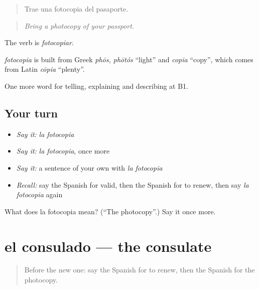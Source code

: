 \begin{quote}
Trae una fotocopia del pasaporte.
\end{quote}

\begin{quote}
\emph{Bring a photocopy of your passport.}
\end{quote}

The verb is \emph{fotocopiar}.

\begin{cousinweb}
\emph{fotocopia} is built from Greek \emph{phōs, phōtós} \textquotedblleft{}light\textquotedblright{} and \emph{copia} \textquotedblleft{}copy\textquotedblright{}, which comes from Latin \emph{cōpia} \textquotedblleft{}plenty\textquotedblright{}.
\end{cousinweb}

\begin{grammarlens}[title={What you've built}]
One more word for telling, explaining and describing at B1.
\end{grammarlens}

\subsection*{Your turn}
\begin{itemize}
\raggedright
  \item \emph{Say it:} \emph{la fotocopia}
  \item \emph{Say it:} \emph{la fotocopia}, once more
  \item \emph{Say it:} a sentence of your own with \emph{la fotocopia}
  \item \emph{Recall:} say the Spanish for valid, then the Spanish for to renew, then say \emph{la fotocopia} again
\end{itemize}

\begin{tcolorbox}[breakable,colback=teal!4,colframe=teal!35!black,title={Before you move on}]
What does la fotocopia mean? (\textquotedblleft{}The photocopy\textquotedblright{}.) Say it once more.
\end{tcolorbox}
\section[el consulado]{el consulado — the consulate}

\label{lesson:ES-C657-consulado}



\begin{quote}
Before the new one: say the Spanish for to renew, then the Spanish for the photocopy.
\end{quote}

